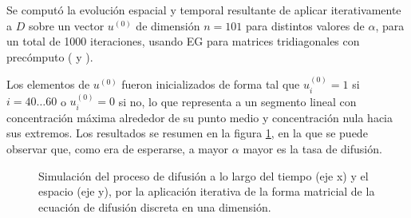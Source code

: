 Se computó la evolución espacial y temporal resultante de aplicar iterativamente a $D$ sobre un vector $u^{(0)}$ de dimensión $n=101$ para distintos valores de $\alpha$, para un total de 1000 iteraciones, usando EG para matrices tridiagonales con precómputo ( y ). 

Los elementos de $u^{(0)}$ fueron inicializados de forma tal que $u_i^{(0)} = 1$ si $i = 40 \hdots 60$ o $u_i^{(0)} = 0$ si no, lo que representa a un segmento lineal con concentración máxima alrededor de su punto medio y concentración nula hacia sus extremos. Los resultados se resumen en la figura \ref{fig:difusión}, en la que se puede observar que, como era de esperarse, a mayor $\alpha$ mayor es la tasa de difusión.

\begin{figure}[h!]
    \centering
    \caption{Simulación del proceso de difusión a lo largo del tiempo (eje x) y el espacio (eje y), por la aplicación iterativa de la forma matricial de la ecuación de difusión discreta en una dimensión.}
    \label{fig:difusión}
\end{figure}


